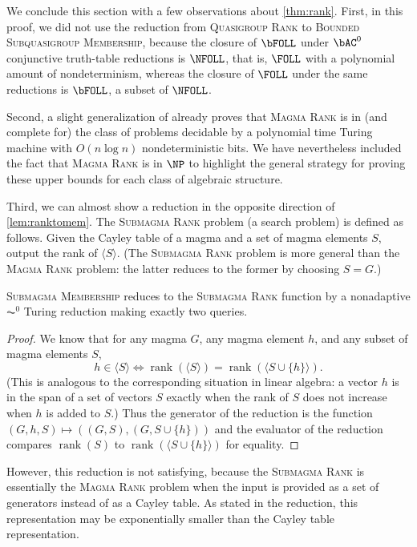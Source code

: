 \documentclass{article}
\newcommand{\gen}[1]{\langle #1 \rangle}
\DeclareMathOperator{\rank}{rank}
\begin{document}
We conclude this section with a few observations about \autoref{thm:rank}.
First, in this proof, we did not use the reduction from \textsc{Quasigroup Rank} to \textsc{Bounded Subquasigroup Membership}, because the closure of $\bFOLL$ under $\bAC^0$ conjunctive truth-table reductions is $\NFOLL$, that is, $\FOLL$ with a polynomial amount of nondeterminism, whereas the closure of $\FOLL$ under the same reductions is $\bFOLL$, a subset of $\NFOLL$.

Second, a slight generalization of \autocite[Theorem~7]{py96} already proves that \textsc{Magma Rank} is in (and complete for) the class of problems decidable by a polynomial time Turing machine with $O(n \log n)$ nondeterministic bits.
We have nevertheless included the fact that \textsc{Magma Rank} is in $\NP$ to highlight the general strategy for proving these upper bounds for each class of algebraic structure.

Third, we can almost show a reduction in the opposite direction of \autoref{lem:ranktomem}.
The \textsc{Submagma Rank} problem (a search problem) is defined as follows.
Given the Cayley table of a magma and a set of magma elements $S$, output the rank of $\gen{S}$.
(The \textsc{Submagma Rank} problem is more general than the \textsc{Magma Rank} problem: the latter reduces to the former by choosing $S = G$.)

\begin{proposition}
  \textsc{Submagma Membership} reduces to the \textsc{Submagma Rank} function by a nonadaptive $\AC^0$ Turing reduction making exactly two queries.
\end{proposition}
\begin{proof}
  We know that for any magma $G$, any magma element $h$, and any subset of magma elements $S$,
  \begin{equation*}
    h \in \gen{S} \iff \rank(\gen{S}) = \rank(\gen{S \cup \{h\}}).
  \end{equation*}
  (This is analogous to the corresponding situation in linear algebra: a vector $h$ is in the span of a set of vectors $S$ exactly when the rank of $S$ does not increase when $h$ is added to $S$.)
  Thus the generator of the reduction is the function $(G, h, S) \mapsto ((G, S), (G, S \cup \{h\}))$ and the evaluator of the reduction compares $\rank({S})$ to $\rank(\gen{S \cup \{h\}})$ for equality.
\end{proof}

However, this reduction is not satisfying, because the \textsc{Submagma Rank} is essentially the \textsc{Magma Rank} problem when the input is provided as a set of generators instead of as a Cayley table.
As stated in the reduction, this representation may be exponentially smaller than the Cayley table representation.
\end{document}
